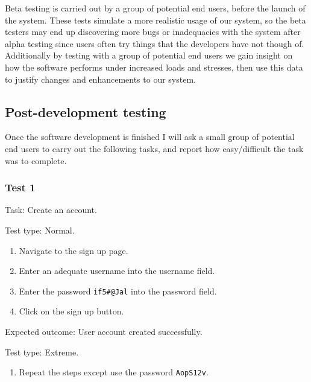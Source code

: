 Beta testing is carried out by a group of potential end
users, before the launch of the system. These tests 
simulate a more realistic usage of our system, so the 
beta testers may end up discovering more bugs or 
inadequacies with the system after alpha testing since users
often try things that the developers have not though of. 
Additionally by testing with a group of potential end users 
we gain insight on how the software performs under increased 
loads and stresses, then use this data to justify changes
and enhancements to our system.

\subsection{Post-development testing}

Once the software development is finished I will ask a 
small group of potential end users to carry out the following
tasks, and report how easy/difficult the task was to complete.

\subsubsection{Test 1}

{\sffamily Task:} Create an account.\\ 

{\color{gray} \hrulefill}

{\sffamily Test type: Normal.}

\begin{enumerate}
  \item Navigate to the sign up page.
  \item Enter an adequate username into the username field.
  \item Enter the password \texttt{if5\#@Jal} into the password field.
  \item Click on the sign up button.
\end{enumerate}

{\sffamily Expected outcome:} User account created successfully. \\ 

{\color{gray} \hrulefill}

{\sffamily Test type: Extreme.}\\ 

\begin{enumerate}
\item Repeat the steps except use the password \texttt{AopS12v}.\\ 
\end{enumerate}

